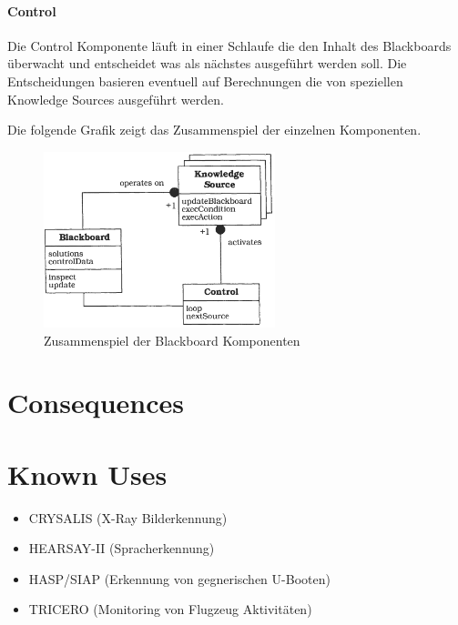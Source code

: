 \paragraph{Control}
Die Control Komponente läuft in einer Schlaufe die den Inhalt des Blackboards überwacht und entscheidet was als nächstes ausgeführt werden soll. Die Entscheidungen basieren eventuell auf Berechnungen die von speziellen Knowledge Sources ausgeführt werden.

Die folgende Grafik zeigt das Zusammenspiel der einzelnen Komponenten.
\begin{figure}[H]
	\centering
	\includegraphics[width=0.6\textwidth]{figures/02-blackboard-1}
	\caption{Zusammenspiel der Blackboard Komponenten}
\end{figure}

\section{Consequences}
\begin{itemize}
\end{itemize}

\section{Known Uses}
\begin{itemize}
	\item CRYSALIS (X-Ray Bilderkennung)
	\item HEARSAY-II (Spracherkennung)
	\item HASP/SIAP (Erkennung von gegnerischen U-Booten)
	\item TRICERO (Monitoring von Flugzeug Aktivitäten) 
\end{itemize}

